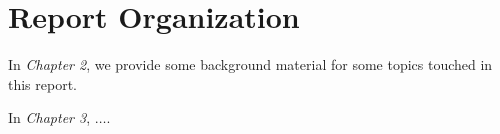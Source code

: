 \section{Report Organization}

In \emph{Chapter 2}, we provide some background material for some topics
touched in this report.

In \emph{Chapter 3}, $\dots$.
